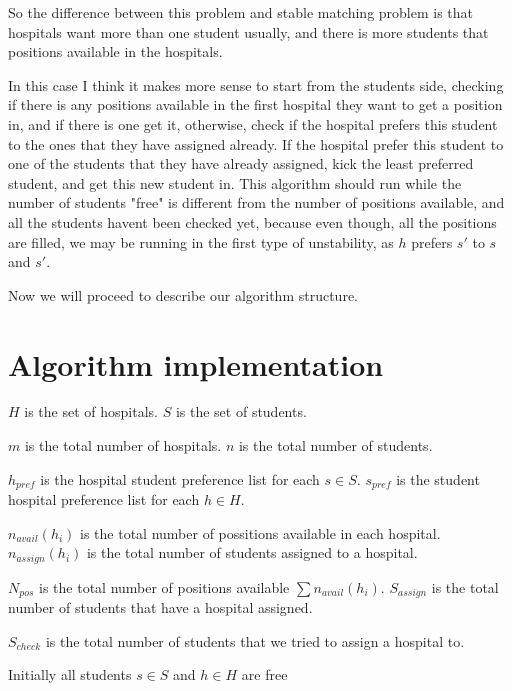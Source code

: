 \documentclass{article}
\begin{document}
So the difference between this problem and stable matching problem is that hospitals want more than one student usually, and there is more students that positions available in the hospitals.

In this case I think it makes more sense to start from the students side, checking if there is any positions available in the first hospital they want to get a position in, and if there is one get it, otherwise, check if the hospital prefers this student to the ones that they have assigned already. If the hospital prefer this student to one of the students that they have already assigned, kick the least preferred student, and get this new student in. This algorithm should run while the number of students "free" is different from the number of positions available, and all the students havent been checked yet, because even though, all the positions are filled, we may be running in the first type of unstability, as $h$ prefers $s'$ to $s$ and $s'$.

Now we will proceed to describe our algorithm structure.

\section{Algorithm implementation}

$H$ is the set of hospitals.
$S$ is the set of students.

$m$ is the total number of hospitals.
$n$ is the total number of students.

$h_{pref}$ is the hospital student preference list for each $s \in S$.
$s_{pref}$ is the student hospital preference list for each $h \in H$.

$n_{avail} (h_i)$ is the total number of possitions available in each hospital.
$n_{assign} (h_i)$ is the total number of students assigned to a hospital.

$N_{pos}$ is the total number of positions available $\sum n_{avail} (h_i)$.
$S_{assign}$ is the total number of students that have a hospital assigned.

$S_{check}$ is the total number of students that we tried to assign a hospital to.

Initially all students $s \in S$ and $h \in H$ are free
\end{document}
